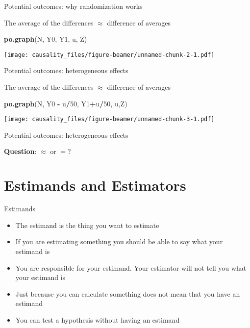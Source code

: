 \documentclass[11pt,ignorenonframetext,]{beamer}
\newenvironment{Shaded}{\begin{snugshade}}{\end{snugshade}}
\newcommand{\KeywordTok}[1]{\textcolor[rgb]{0.13,0.29,0.53}{\textbf{#1}}}
\newcommand{\DecValTok}[1]{\textcolor[rgb]{0.00,0.00,0.81}{#1}}
\newcommand{\StringTok}[1]{\textcolor[rgb]{0.31,0.60,0.02}{#1}}
\newcommand{\OperatorTok}[1]{\textcolor[rgb]{0.81,0.36,0.00}{\textbf{#1}}}
\newcommand{\NormalTok}[1]{#1}
\providecommand{\tightlist}{%
  \setlength{\itemsep}{0pt}\setlength{\parskip}{0pt}}
\begin{document}
\begin{frame}[fragile]{Potential outcomes: why randomization works}

The average of the differences \(\approx\) difference of averages

\begin{Shaded}
\begin{Highlighting}[]
\KeywordTok{po.graph}\NormalTok{(N, Y0, Y1, u, Z)   }
\end{Highlighting}
\end{Shaded}

\texttt{[image: causality\_files/figure-beamer/unnamed-chunk-2-1.pdf]}

\end{frame}

\begin{frame}[fragile]{Potential outcomes: heterogeneous effects}

The average of the differences \(\approx\) difference of averages

\begin{Shaded}
\begin{Highlighting}[]
\KeywordTok{po.graph}\NormalTok{(N, Y0 }\OperatorTok{-}\StringTok{ }\NormalTok{u}\OperatorTok{/}\DecValTok{50}\NormalTok{, Y1}\OperatorTok{+}\NormalTok{u}\OperatorTok{/}\DecValTok{50}\NormalTok{, u,Z)}
\end{Highlighting}
\end{Shaded}

\texttt{[image: causality\_files/figure-beamer/unnamed-chunk-3-1.pdf]}

\end{frame}

\begin{frame}{Potential outcomes: heterogeneous effects}

\textbf{Question}: \(\approx\) or \(=\)?

\end{frame}

\section{Estimands and Estimators}\label{estimands-and-estimators}

\begin{frame}{Estimands}

\begin{itemize}
\tightlist
\item
  The estimand is the thing you want to estimate
\item
  If you are estimating something you should be able to say what your
  estimand is
\item
  You are responsible for your estimand. Your estimator will not tell
  you what your estimand is
\item
  Just because you can calculate something does not mean that you have
  an estimand
\item
  You can test a hypothesis without having an estimand
\end{itemize}

\end{frame}
\end{document}
